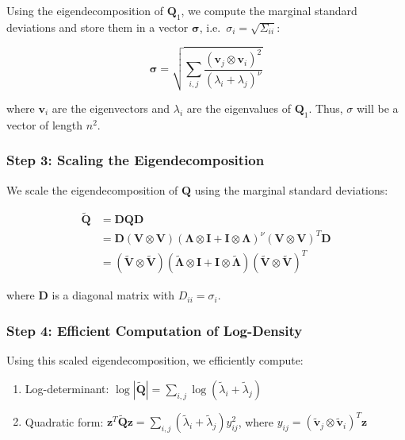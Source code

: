 \documentclass[journal=,manuscript=]{achemso}
\begin{document}
Using the eigendecomposition of \(\mathbf{Q}_1\), we compute the
marginal standard deviations and store them in a vector
\(\mathbf{\sigma}\), i.e.~\(\sigma_i = \sqrt{\Sigma_{ii}}\):

\[
\mathbf{\sigma} = \sqrt{\sum_{i,j} \frac{(\mathbf{v}_j \otimes \mathbf{v}_i)^2}{(\lambda_i + \lambda_j)^\nu}}
\]

where \(\mathbf{v}_i\) are the eigenvectors and \(\lambda_i\) are the
eigenvalues of \(\mathbf{Q}_1\). Thus, \(\sigma\) will be a vector of
length \(n^2\).

\subsubsection{Step 3: Scaling the
Eigendecomposition}\label{step-3-scaling-the-eigendecomposition}

We scale the eigendecomposition of \(\mathbf{Q}\) using the marginal
standard deviations:

\[
\begin{aligned}
\mathbf{\tilde  Q} &= \mathbf{D}\mathbf{Q}\mathbf{D} \\
&= \mathbf{D}(\mathbf{V} \otimes \mathbf{V})(\mathbf{\Lambda} \otimes \mathbf{I} + \mathbf{I} \otimes \mathbf{\Lambda})^\nu(\mathbf{V} \otimes \mathbf{V})^T\mathbf{D} \\
&= (\mathbf{\tilde V} \otimes \mathbf{\tilde V})(\mathbf{\tilde\Lambda} \otimes \mathbf{I} + \mathbf{I} \otimes \mathbf{\tilde \Lambda})(\mathbf{\tilde V} \otimes \mathbf{\tilde V})^T
\end{aligned}
\]

where \(\mathbf{D}\) is a diagonal matrix with \(D_{ii} = \sigma_i\).

\subsubsection{Step 4: Efficient Computation of
Log-Density}\label{step-4-efficient-computation-of-log-density}

Using this scaled eigendecomposition, we efficiently compute:

\begin{enumerate}
\def\labelenumi{\arabic{enumi}.}
\item
  Log-determinant:
  \(\log|\mathbf{\tilde Q}| = \sum_{i,j} \log(\tilde\lambda_i + \tilde\lambda_j)\)
\item
  Quadratic form:
  \(\mathbf{z}^T\mathbf{\tilde Q}\mathbf{z} = \sum_{i,j} (\tilde\lambda_i + \tilde\lambda_j) y_{ij}^2\),
  where
  \(y_{ij} = (\mathbf{\tilde v}_j \otimes \mathbf{\tilde v}_i)^T\mathbf{z}\)
\end{enumerate}
\end{document}
